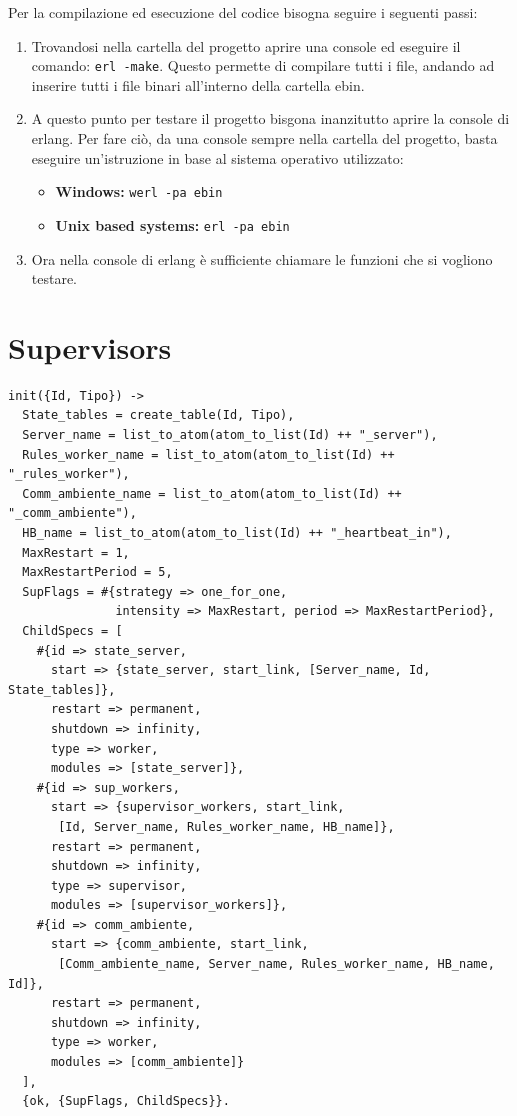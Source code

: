 \documentclass[italian]{memoir}
\begin{document}
Per la compilazione ed esecuzione del codice bisogna seguire i seguenti passi:
\begin{enumerate}
\item Trovandosi nella cartella del progetto aprire una console ed eseguire il comando: \texttt{erl -make}. Questo permette di compilare tutti i file, andando ad inserire tutti i file binari all'interno della cartella ebin.
\item A questo punto per testare il progetto bisgona inanzitutto aprire la console di erlang. Per fare ciò, da una console sempre nella cartella del progetto, basta eseguire un'istruzione in base al sistema operativo utilizzato:
\begin{itemize}
\item \textbf{Windows:} \texttt{werl -pa ebin}
\item \textbf{Unix based systems:} \texttt{erl -pa ebin} 
\end{itemize}
\item Ora nella console di erlang è sufficiente chiamare le funzioni che si vogliono testare.
\end{enumerate}

\chapter{Supervisors}\label{code:supervisor}
\begin{verbatim}
init({Id, Tipo}) ->
  State_tables = create_table(Id, Tipo),
  Server_name = list_to_atom(atom_to_list(Id) ++ "_server"),
  Rules_worker_name = list_to_atom(atom_to_list(Id) ++ "_rules_worker"),
  Comm_ambiente_name = list_to_atom(atom_to_list(Id) ++ "_comm_ambiente"),
  HB_name = list_to_atom(atom_to_list(Id) ++ "_heartbeat_in"),
  MaxRestart = 1,
  MaxRestartPeriod = 5,
  SupFlags = #{strategy => one_for_one, 
               intensity => MaxRestart, period => MaxRestartPeriod},
  ChildSpecs = [
    #{id => state_server,
      start => {state_server, start_link, [Server_name, Id, State_tables]},
      restart => permanent,
      shutdown => infinity,
      type => worker,
      modules => [state_server]},
    #{id => sup_workers,
      start => {supervisor_workers, start_link,
       [Id, Server_name, Rules_worker_name, HB_name]},
      restart => permanent,
      shutdown => infinity,
      type => supervisor,
      modules => [supervisor_workers]},
    #{id => comm_ambiente,
      start => {comm_ambiente, start_link, 
       [Comm_ambiente_name, Server_name, Rules_worker_name, HB_name, Id]},
      restart => permanent,
      shutdown => infinity,
      type => worker,
      modules => [comm_ambiente]}
  ],
  {ok, {SupFlags, ChildSpecs}}.
\end{verbatim}
\end{document}
